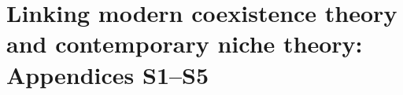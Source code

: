 \chapter{Linking modern coexistence theory and contemporary niche theory: Appendices S1--S5}
\fancyhead[LE, RO]{\thepage}
\fancyfoot{}
\renewcommand{\headrulewidth}{0pt}
\setlength{\parindent}{1cm}

